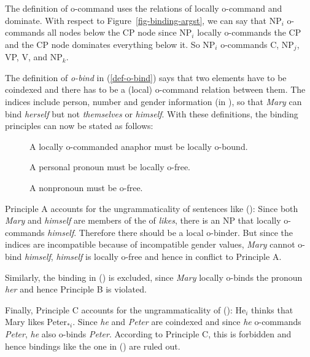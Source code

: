 \documentclass[output=paper
	        ,collection
	        ,collectionchapter
 	        ,biblatex
                ,babelshorthands
                ,newtxmath
                ,draftmode
                ,colorlinks, citecolor=brown
]{langscibook}
\begin{document}
The definition of o-command uses the relations of locally o-command and dominate. With respect to
Figure~\ref{fig-binding-argst}, we can say that NP$_i$ o-commands all nodes below the CP node since
NP$_i$ locally o-commands the CP and the CP node dominates everything below it. So NP$_i$ o-commands
C, NP$_j$, VP, V, and NP$_k$.

The definition of \emph{o-bind} in (\ref{def-o-bind}) says that two elements have to be coindexed
and there has to be a (local) o-command relation between them. The indices include person, number
and gender information (in ), so that \emph{Mary} can bind \emph{herself} but not
\emph{themselves} or \emph{himself}. With these definitions, the binding principles can now be stated
as follows:

\begin{principle-break}
\begin{description}
\item [] A locally o-commanded anaphor must be locally o-bound.
\item [] A personal pronoun must be locally o-free.
\item [] A nonpronoun must be o-free.
\end{description}
\end{principle-break}

\noindent
Principle A accounts for the ungrammaticality of sentences like ():
\z
Since both \emph{Mary} and \emph{himself} are members of the \argstl of \emph{likes}, there is an NP
that locally o-commands \emph{himself}. Therefore there should be a local o-binder. But since the
indices are incompatible because of incompatible gender values, \emph{Mary} cannot o-bind
\emph{himself}, \emph{himself} is locally o-free and hence in conflict to Principle A.

Similarly, the binding in () is excluded, since \emph{Mary} locally o-binds the pronoun \emph{her}
and hence Principle B is violated.
\z

\noindent
Finally, Principle C accounts for the ungrammaticality of ():
\ea
He$_i$ thinks that Mary likes Peter$_{*i}$.
\z
Since \emph{he} and \emph{Peter} are coindexed and since \emph{he} o-commands \emph{Peter},
\emph{he} also o-binds \emph{Peter}. According to Principle C, this is forbidden and hence bindings
like the one in () are ruled out.
\end{document}
